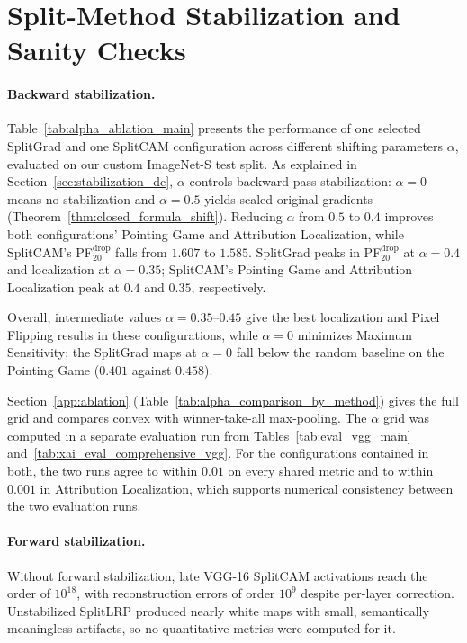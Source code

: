 \section{Split-Method Stabilization and Sanity Checks}\label{sec:ablations}

\paragraph{Backward stabilization.}\label{subsec:alpha_ablation}

Table~\ref{tab:alpha_ablation_main} presents the performance of one selected SplitGrad and one SplitCAM configuration across different shifting parameters $\alpha$, evaluated on our custom ImageNet-S test split. As explained in Section~\ref{sec:stabilization_dc}, $\alpha$ controls backward pass stabilization: $\alpha = 0$ means no stabilization and $\alpha = 0.5$ yields scaled original gradients (Theorem~\ref{thm:closed_formula_shift}). Reducing $\alpha$ from $0.5$ to $0.4$ improves both configurations' Pointing Game and Attribution Localization, while SplitCAM's PF$^{\mathrm{drop}}_{20}$ falls from $1.607$ to $1.585$. SplitGrad peaks in PF$^{\mathrm{drop}}_{20}$ at $\alpha = 0.4$ and localization at $\alpha = 0.35$; SplitCAM's Pointing Game and Attribution Localization peak at $0.4$ and $0.35$, respectively. \begin{changed}Overall, intermediate values $\alpha=0.35$--$0.45$ give the best localization and Pixel Flipping results in these configurations, while $\alpha=0$ minimizes Maximum Sensitivity; the SplitGrad maps at $\alpha=0$ fall below the random baseline on the Pointing Game ($0.401$ against $0.458$).\end{changed} Section~\ref{app:ablation} (Table~\ref{tab:alpha_comparison_by_method}) gives the full grid and compares convex with winner-take-all max-pooling. The $\alpha$ grid was computed in a separate evaluation run from Tables~\ref{tab:eval_vgg_main} and~\ref{tab:xai_eval_comprehensive_vgg}. For the configurations contained in both, the two runs agree to within $0.01$ on every shared metric and to within $0.001$ in Attribution Localization, which supports numerical consistency between the two evaluation runs.



\paragraph{Forward stabilization.}
Without forward stabilization, late VGG-16 SplitCAM activations reach the order of $10^{18}$, with reconstruction errors of order $10^9$ despite per-layer correction. Unstabilized SplitLRP produced nearly white maps with small, semantically meaningless artifacts, so no quantitative metrics were computed for it.

